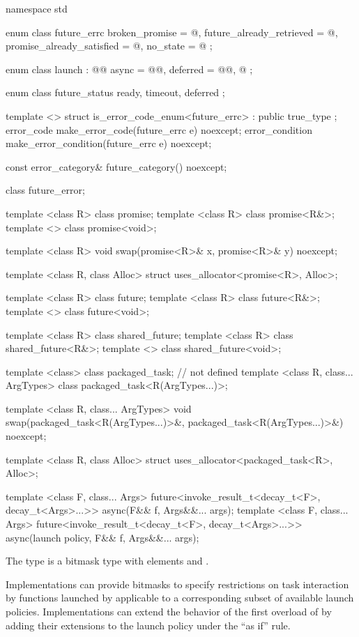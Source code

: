 %
%
%
\begin{codeblock}
namespace std {
  enum class future_errc {
    broken_promise = @\impdef@,
    future_already_retrieved = @\impdef@,
    promise_already_satisfied = @\impdef@,
    no_state = @\impdef@
  };

  enum class launch : @\unspec{}@ {
    async = @\unspec{}@,
    deferred = @\unspec{}@,
    @\impdef@
  };

  enum class future_status {
    ready,
    timeout,
    deferred
  };

  template <> struct is_error_code_enum<future_errc> : public true_type { };
  error_code make_error_code(future_errc e) noexcept;
  error_condition make_error_condition(future_errc e) noexcept;

  const error_category& future_category() noexcept;

  class future_error;

  template <class R> class promise;
  template <class R> class promise<R&>;
  template <> class promise<void>;

  template <class R>
    void swap(promise<R>& x, promise<R>& y) noexcept;

  template <class R, class Alloc>
    struct uses_allocator<promise<R>, Alloc>;

  template <class R> class future;
  template <class R> class future<R&>;
  template <> class future<void>;

  template <class R> class shared_future;
  template <class R> class shared_future<R&>;
  template <> class shared_future<void>;

  template <class> class packaged_task;   // not defined
  template <class R, class... ArgTypes>
    class packaged_task<R(ArgTypes...)>;

  template <class R, class... ArgTypes>
    void swap(packaged_task<R(ArgTypes...)>&, packaged_task<R(ArgTypes...)>&) noexcept;

  template <class R, class Alloc>
    struct uses_allocator<packaged_task<R>, Alloc>;

  template <class F, class... Args>
    future<invoke_result_t<decay_t<F>, decay_t<Args>...>>
    async(F&& f, Args&&... args);
  template <class F, class... Args>
    future<invoke_result_t<decay_t<F>, decay_t<Args>...>>
    async(launch policy, F&& f, Args&&... args);
}
\end{codeblock}

\pnum
The  type  is a bitmask type with
elements  and .
\begin{note} Implementations can provide bitmasks to specify restrictions on task
interaction by functions launched by  applicable to a
corresponding subset of available launch policies. Implementations can extend
the behavior of the first overload of  by adding their extensions
to the launch policy under the ``as if'' rule. \end{note}

